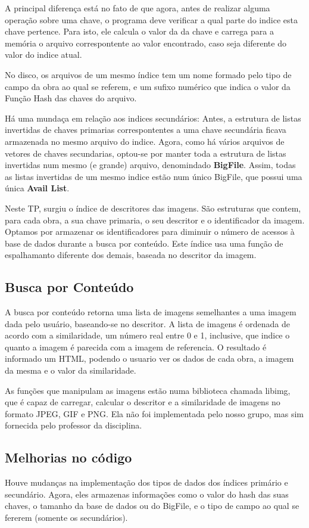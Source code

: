 \documentclass[10pt,a4paper,draft]{article}
\begin{document}
A principal diferença está no fato de que agora, antes de realizar alguma
operação sobre uma chave, o programa deve verificar a qual parte do indice esta
chave pertence. Para isto, ele calcula o valor da  da chave
e carrega para a memória o arquivo correspontente ao valor encontrado, caso seja
diferente do valor do indice atual.

No disco, os arquivos de um mesmo índice tem um nome formado pelo tipo de campo
da obra ao qual se referem, e um sufixo numérico que indica o valor da Função
Hash das chaves do arquivo.

Há uma mundaça em relação aos indices secundários: Antes, a estrutura de listas
invertidas de chaves primarias correspontentes a uma chave secundária ficava
armazenada no mesmo arquivo do indice. Agora, como há vários arquivos de
vetores de chaves secundarias, optou-se por manter toda a estrutura de listas
invertidas num mesmo (e grande) arquivo, denomindado \textbf{BigFile}. Assim,
todas as listas invertidas de um mesmo indice estão num único BigFile, que possui uma
única \textbf{Avail List}.

Neste TP, surgiu o índice de descritores das imagens. São estruturas que
contem, para cada obra, a sua chave primaria, o seu descritor e o identificador
da imagem. Optamos por armazenar os identificadores para diminuir o número de
acessos à base de dados durante a \textsf{busca por conteúdo}. Este índice usa
uma função de espalhamanto diferente dos demais, baseada no descritor da imagem.

\subsection{Busca por Conteúdo}
A busca por conteúdo retorna uma lista de imagens semelhantes a uma imagem dada
pelo usuário, baseando-se no descritor. A lista de imagens é ordenada de acordo
com a similaridade, um número real entre 0 e 1, inclusive, que indice o quanto
a imagem é parecida com a imagem de referencia. O resultado é informado um
HTML, podendo o usuario ver os dados de cada obra, a imagem da mesma e o valor
da similaridade.

As funções que manipulam as imagens estão numa biblioteca chamada libimg, que é
capaz de carregar, calcular o descritor e a similaridade de imagens no formato
JPEG, GIF e PNG. Ela não foi implementada pelo nosso grupo, mas sim
fornecida pelo professor da disciplina.

\subsection{Melhorias no código}
Houve mudanças na implementação dos tipos de dados dos índices primário e
secundário. Agora, eles armazenas informações como o valor do hash das suas
chaves, o tamanho da base de dados ou do BigFile, e o tipo de campo ao qual 
se fererem (somente os secundários).
\end{document}

